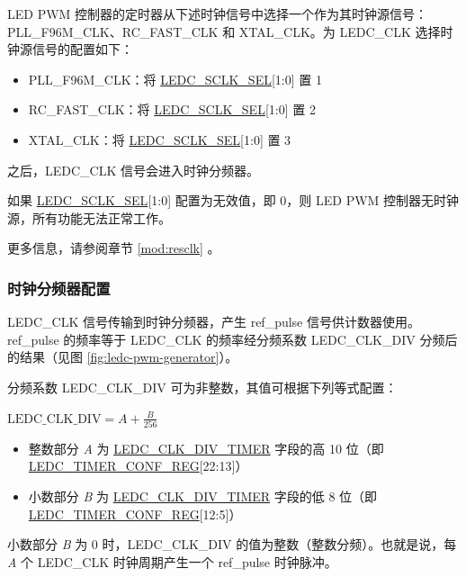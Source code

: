 \documentclass[main\_\_CN.tex]{subfiles}
\begin{document}
LED PWM 控制器的定时器从下述时钟信号中选择一个作为其时钟源信号：PLL\_F96M\_CLK、RC\_FAST\_CLK 和 XTAL\_CLK。为 LEDC\_CLK 选择时钟源信号的配置如下：

\begin{itemize}
    \item PLL\_F96M\_CLK：将 \hyperref[fielddesc:LEDCSCLKSEL]{LEDC\_SCLK\_SEL}[1:0] 置 1
    \item RC\_FAST\_CLK：将 \hyperref[fielddesc:LEDCSCLKSEL]{LEDC\_SCLK\_SEL}[1:0] 置 2
    \item XTAL\_CLK：将 \hyperref[fielddesc:LEDCSCLKSEL]{LEDC\_SCLK\_SEL}[1:0] 置 3
\end{itemize}

之后，LEDC\_CLK 信号会进入时钟分频器。

如果 \hyperref[fielddesc:LEDCSCLKSEL]{LEDC\_SCLK\_SEL}[1:0] 配置为无效值，即 0，则 LED PWM 控制器无时钟源，所有功能无法正常工作。

更多信息，请参阅章节 \ref{mod:resclk} \textit{}。

\subsubsection{时钟分频器配置}

LEDC\_CLK 信号传输到时钟分频器，产生 ref\_pulse 信号供计数器使用。ref\_pulse 的频率等于 LEDC\_CLK 的频率经分频系数 LEDC\_CLK\_DIV 分频后的结果（见图 \ref{fig:ledc-pwm-generator}）。

分频系数 LEDC\_CLK\_DIV 可为非整数，其值可根据下列等式配置：

\begin{center}
$\textrm{LEDC\_CLK\_DIV}= A + \frac{B}{256}$
\end{center}

\begin{itemize}
    \item 整数部分 \textit{A} 为 \hyperref[fielddesc:LEDCCLKDIVTIMERX]{LEDC\_CLK\_DIV\_TIMER} 字段的高 10 位（即 \hyperref[regdesc:LEDCTIMERXCONFREG]{LEDC\_TIMER\_CONF\_REG}[22:13]）
    \item 小数部分 \textit{B} 为 \hyperref[fielddesc:LEDCCLKDIVTIMERX]{LEDC\_CLK\_DIV\_TIMER} 字段的低 8 位（即 \hyperref[regdesc:LEDCTIMERXCONFREG]{LEDC\_TIMER\_CONF\_REG}[12:5]）
\end{itemize}

小数部分 \textit{B} 为 0 时，LEDC\_CLK\_DIV 的值为整数（整数分频）。也就是说，每 \textit{A} 个 LEDC\_CLK 时钟周期产生一个 ref\_pulse 时钟脉冲。
\end{document}
